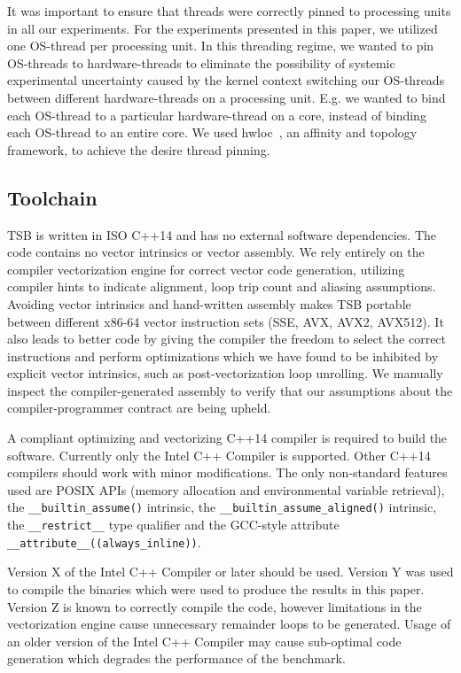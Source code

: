 \documentclass[conference]{IEEEtran}
\begin{document}
It was important to ensure that threads were correctly pinned to processing
units in all our experiments. For the experiments presented in this paper, we
utilized one OS-thread per processing unit. In this threading regime, we wanted
to pin OS-threads to hardware-threads to eliminate the possibility of systemic
experimental uncertainty caused by the kernel context switching our OS-threads
between different hardware-threads on a processing unit. E.g. we wanted to bind
each OS-thread to a particular hardware-thread on a core, instead of binding
each OS-thread to an entire core. We used hwloc~\cite{}, an affinity and
topology framework, to achieve the desire thread pinning.

\subsection{Toolchain}

TSB is written in ISO C++14 and has no external software dependencies. The code
contains no vector intrinsics or vector assembly. We rely entirely on the
compiler vectorization engine for correct vector code generation, utilizing
compiler hints to indicate alignment, loop trip count and aliasing assumptions.
Avoiding vector intrinsics and hand-written assembly makes TSB portable between
different x86-64 vector instruction sets (SSE, AVX, AVX2, AVX512). It also
leads to better code by giving the compiler the freedom to select the correct
instructions and perform optimizations which we have found to be inhibited by
explicit vector intrinsics, such as post-vectorization loop unrolling. We
manually inspect the compiler-generated assembly to verify that our assumptions
about the compiler-programmer contract are being upheld.

A compliant optimizing and vectorizing C++14 compiler is required to build the
software. Currently only the Intel C++ Compiler is supported. Other C++14
compilers should work with minor modifications. The only non-standard features
used are POSIX APIs (memory allocation and environmental variable retrieval),
the \lstinline{__builtin_assume()} intrinsic, the
\lstinline{__builtin_assume_aligned()} intrinsic, the \lstinline{__restrict__}
type qualifier and the GCC-style attribute
\lstinline{__attribute__((always_inline))}. 

Version X of the Intel C++ Compiler or later should be used. Version Y was used
to compile the binaries which were used to produce the results in this paper.
Version Z is known to correctly compile the code, however limitations in the
vectorization engine cause unnecessary remainder loops to be generated. Usage
of an older version of the Intel C++ Compiler may cause sub-optimal code
generation which degrades the performance of the benchmark.
\end{document}
